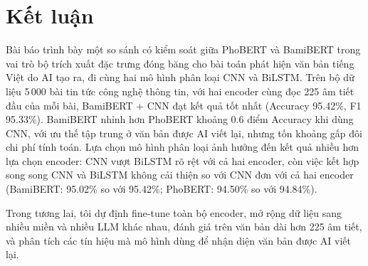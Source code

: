\documentclass[conference,a4paper]{IEEEtran}
\begin{document}
\section{Kết luận}
\label{sec:conclusion}
Bài báo trình bày một so sánh có kiểm soát giữa PhoBERT và BamiBERT trong vai trò bộ trích xuất đặc trưng đóng băng cho bài toán phát hiện văn bản tiếng Việt do AI tạo ra, đi cùng hai mô hình phân loại CNN và BiLSTM. Trên bộ dữ liệu 5\,000 bài tin tức công nghệ thông tin, với hai encoder cùng đọc 225 âm tiết đầu của mỗi bài, BamiBERT + CNN đạt kết quả tốt nhất (Accuracy 95.42\%, F1 95.33\%). BamiBERT nhỉnh hơn PhoBERT khoảng 0.6 điểm Accuracy khi dùng CNN, với ưu thế tập trung ở văn bản được AI viết lại, nhưng tốn khoảng gấp đôi chi phí tính toán. Lựa chọn mô hình phân loại ảnh hưởng đến kết quả nhiều hơn lựa chọn encoder: CNN vượt BiLSTM rõ rệt với cả hai encoder, còn việc kết hợp song song CNN và BiLSTM không cải thiện so với CNN đơn với cả hai encoder (BamiBERT: 95.02\% so với 95.42\%; PhoBERT: 94.50\% so với 94.84\%).

Trong tương lai, tôi dự định fine-tune toàn bộ encoder, mở rộng dữ liệu sang nhiều miền và nhiều LLM khác nhau, đánh giá trên văn bản dài hơn 225 âm tiết, và phân tích các tín hiệu mà mô hình dùng để nhận diện văn bản được AI viết lại.
\end{document}
